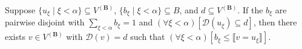Suppose $\{u_\xi \mid \xi < \alpha\} \subseteq V^{(\mathbf{B})}$, $\{b_\xi \mid \xi < \alpha\} \subseteq B$, and $d \subseteq V^{(\mathbf{B})}$. If the $b_\xi$ are pairwise disjoint with $\sum_{\xi < \alpha} b_\xi = 1$ and $(\forall \xi < \alpha)[\mathcal{D}(u_\xi) \subseteq d]$, then there exists $v \in V^{(\mathbf{B})}$ with $\mathcal{D}(v) = d$ such that $(\forall \xi < \alpha)[b_\xi \leq \llbracket v = u_\xi \rrbracket]$.
